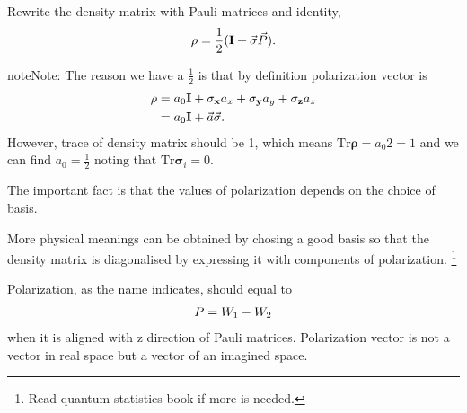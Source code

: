 \documentclass[letterpaper,12pt,english]{sphinxmanual}
\begin{document}
Rewrite the density matrix with Pauli matrices and identity,
\begin{gather}
\begin{split}\mathbf \rho = \frac{1}{2} ( \mathbf I + \vec{\mathbf \sigma} \vec P ).\end{split}\notag
\end{gather}
\begin{notice}{note}{Note:}
The reason we have a \(\frac{1}{2}\) is that by definition polarization vector is
\begin{gather}
\begin{split}\mathbf \rho &= a_0 \mathbf I + \mathbf {\sigma_x} a_x +  \mathbf {\sigma_y} a_y +  \mathbf {\sigma_z} a_z \\
& = a_0 \mathbf I + \vec a \vec{\mathbf \sigma}.\end{split}\notag
\end{gather}
However, trace of density matrix should be 1, which means \(\mathrm{Tr} \mathbf \rho = a_0 2 =1\) and we can find \(a_0=\frac{1}{2}\) noting that \(\mathrm {Tr}\mathbf \sigma_i = 0\).
\end{notice}

The important fact is that the values of polarization depends on the choice of basis.

More physical meanings can be obtained by chosing a good basis so that the density matrix is diagonalised by expressing it with components of polarization. \footnote[4]{
Read quantum statistics book if more is needed.
}

Polarization, as the name indicates, should equal to
\begin{gather}
\begin{split}P = W_1 - W_2\end{split}\notag
\end{gather}
when it is aligned with z direction of Pauli matrices. Polarization vector is not a vector in real space but a vector of an imagined space.
\end{document}
